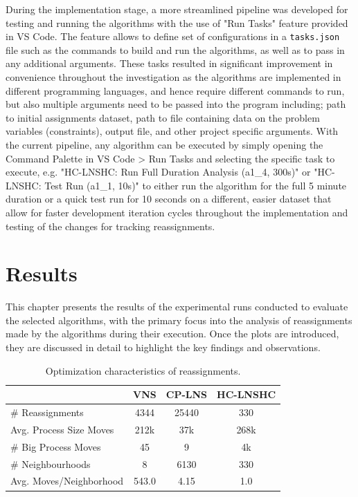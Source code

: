 \documentclass[a4paper,12pt]{Classes/RoboticsLaTeX}
\begin{document}
During the implementation stage, a more streamlined pipeline was developed for testing and running the algorithms with the use of "Run Tasks" feature provided in VS Code. The feature allows to define set of configurations in a \texttt{tasks.json} file such as the commands to build and run the algorithms, as well as to pass in any additional arguments. These tasks resulted in significant improvement in convenience throughout the investigation as the algorithms are implemented in different programming languages, and hence require different commands to run, but also multiple arguments need to be passed into the program including; path to initial assignments dataset, path to file containing data on the problem variables (constraints), output file, and other project specific arguments. With the current pipeline, any algorithm can be executed by simply opening the Command Palette in VS Code > Run Tasks and selecting the specific task to execute, e.g. "HC-LNSHC: Run Full Duration Analysis (a1\_4, 300s)" or "HC-LNSHC: Test Run (a1\_1, 10s)" to either run the algorithm for the full 5 minute duration or a quick test run for 10 seconds on a different, easier dataset that allow for faster development iteration cycles throughout the implementation and testing of the changes for tracking reassignments.


\chapter{Results} \label{chap:results}

This chapter presents the results of the experimental runs conducted to evaluate the selected algorithms, with the primary focus into the analysis of reassignments made by the algorithms during their execution. Once the plots are introduced, they are discussed in detail to highlight the key findings and observations.

\begin{table}[h]
    \centering
    \begin{tabular}{l|c|c|c}
        & VNS & CP-LNS & HC-LNSHC \\ 
        \hline
        \# Reassignments & 4344 & 25440 & 330 \\ 
        Avg. Process Size Moves & 212k & 37k & 268k \\ 
        \# Big Process Moves & 45 & 9 & 4k \\ 
        \# Neighbourhoods & 8 & 6130 & 330 \\
        Avg. Moves/Neighborhood & 543.0 & 4.15 & 1.0 \\

    \end{tabular}
    \caption{Optimization characteristics of reassignments.}
    \label{tab:reassignment_summary}
\end{table}
\end{document}
